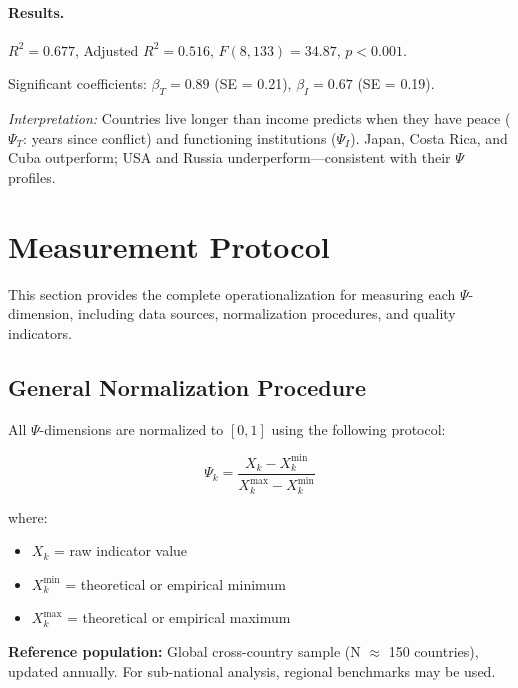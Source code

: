 \paragraph{Results.}
$R^2 = 0.677$, Adjusted $R^2 = 0.516$, $F(8,133) = 34.87$, $p < 0.001$.

Significant coefficients: $\beta_T = 0.89$ (SE = 0.21), $\beta_I = 0.67$ (SE = 0.19).

\textit{Interpretation:} Countries live longer than income predicts when they have peace ($\Psi_T$: years since conflict) and functioning institutions ($\Psi_I$). Japan, Costa Rica, and Cuba outperform; USA and Russia underperform---consistent with their $\Psi$ profiles.



\section{Measurement Protocol}
\label{sec:V-measurement}

This section provides the complete operationalization for measuring each 
$\Psi$-dimension, including data sources, normalization procedures, and 
quality indicators.

\subsection{General Normalization Procedure}

All $\Psi$-dimensions are normalized to $[0,1]$ using the following protocol:

\begin{equation}
\Psi_k = \frac{X_k - X_k^{\min}}{X_k^{\max} - X_k^{\min}}
\label{eq:psi-normalization}
\end{equation}

where:
\begin{itemize}[nosep]
    \item $X_k$ = raw indicator value
    \item $X_k^{\min}$ = theoretical or empirical minimum
    \item $X_k^{\max}$ = theoretical or empirical maximum
\end{itemize}

\textbf{Reference population:} Global cross-country sample (N $\approx$ 150 countries), 
updated annually. For sub-national analysis, regional benchmarks may be used.

